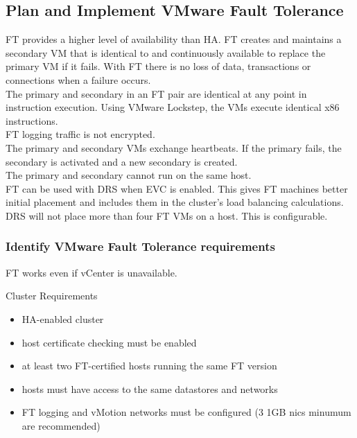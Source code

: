 \subsection{Plan and Implement VMware Fault Tolerance}

FT provides a higher level of availability than HA. FT creates and maintains
a secondary VM that is identical to and continuously available to replace
the primary VM if it fails. With FT there is no loss of data, transactions or
connections when a failure occurs.\\

The primary and secondary in an FT pair are identical at any point in
instruction execution. Using VMware Lockstep, the VMs execute identical x86
instructions.\\

FT logging traffic is not encrypted.\\

The primary and secondary VMs exchange heartbeats. If the primary fails,
the secondary is activated and a new secondary is created.\\

The primary and secondary cannot run on the same host.\\

FT can be used with DRS when EVC is enabled. This gives FT machines better
initial placement and includes them in the cluster's load balancing
calculations.\\

DRS will not place more than four FT VMs on a host. This is configurable.\\

\subsubsection{Identify VMware Fault Tolerance requirements}

FT works even if vCenter is unavailable.

Cluster Requirements

\begin{itemize}

\item HA-enabled cluster

\item host certificate checking must be enabled

\item at least two FT-certified hosts running the same FT version

\item hosts must have access to the same datastores and networks

\item FT logging and vMotion networks must be configured (3 1GB nics minumum
are recommended)

\end{itemize}

